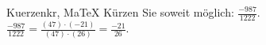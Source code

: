 \begin{MAufgabe}{Kuerzen}{kr, MaTeX}
K\"urzen Sie soweit m\"oglich: $\frac{-987}{1222}$.\\ 
\ifLsg\MLoesung
\quad $\frac{-987}{1222}=\frac{(47)\cdot(-21)}{(47)\cdot(26)}=\frac{-21}{26}$.\else\relax\fi
 \end{MAufgabe}